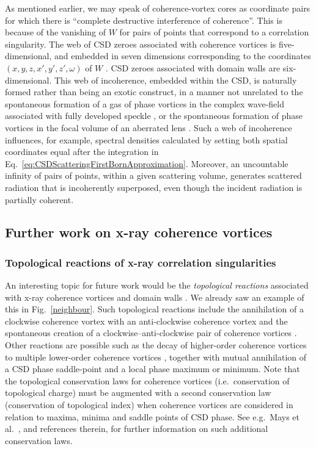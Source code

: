 \documentclass[%
 reprint,
 amsmath,amssymb,
 aps,
]{revtex4-1}
\begin{document}
As mentioned earlier, we may speak of coherence-vortex cores as coordinate pairs for which there is ``complete destructive interference of coherence''. This is because of the vanishing of $W$ for pairs of points that correspond to a correlation singularity.  The web of CSD zeroes  associated with coherence vortices is five-dimensional, and embedded in seven dimensions corresponding to the coordinates $(x,y,z,x',y',z',\omega)$ of $W$ \cite{Marasinghe2010}. CSD zeroes associated with domain walls are six-dimensional.  This web of incoherence, embedded within the CSD, is naturally formed rather than being an exotic construct, in a manner not unrelated to the spontaneous formation of a gas of phase vortices in the complex wave-field associated with fully developed speckle \cite{OHolleran2008}, or the spontaneous formation of phase vortices in the focal volume of an aberrated lens \cite{BoivinDowWolf1967}.  Such a web of incoherence influences, for example, spectral densities calculated by setting both spatial coordinates equal after the integration in Eq.~\ref{eq:CSDScatteringFirstBornApproximation}.  Moreover, an uncountable infinity of pairs of points, within a given scattering volume, generates scattered radiation that is incoherently superposed, even though the incident radiation is partially coherent.

\subsection{Further work on x-ray coherence vortices}\label{subsec:Discussion-part-3}

\subsubsection{Topological reactions of x-ray correlation singularities} 

An interesting topic for future work would be the {\em topological reactions} associated with x-ray coherence vortices and domain walls  \cite{GburSPIE,TopologicalReactionsCohVortices,Marasinghe2010}.  We already saw an example of this in Fig.~\ref{neighbour}.  Such topological reactions include the annihilation of a clockwise coherence vortex with an anti-clockwise coherence vortex and the spontaneous creation of a clockwise--anti-clockwise pair of coherence vortices \cite{TopologicalReactionsCohVortices}.  Other reactions are possible such as the decay of higher-order coherence vortices to multiple lower-order coherence vortices \cite{TopologicalReactionsCohVortices}, together with mutual annihilation of a CSD phase saddle-point and a local phase maximum or minimum.  Note that the topological conservation laws for coherence vortices (i.e.~conservation of topological charge) must be augmented with a second conservation law (conservation of topological index) when coherence vortices are considered in relation to maxima, minima and saddle points of CSD phase.  See e.g.~Mays et al.~\cite{MaysPonsaingPaganin2018}, and references therein, for further information on such additional conservation laws. 
\end{document}
